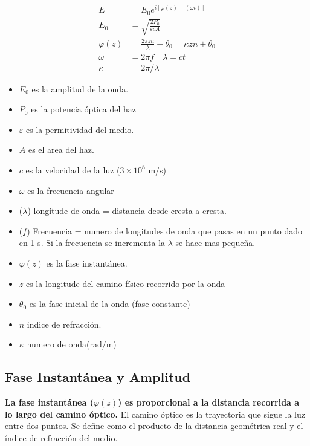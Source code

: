 \documentclass[12pt]{article}
\begin{document}
	\vspace{0.5cm}
	\begin{minipage}{0.45\textwidth}
		\begin{align*}
			E &= E_0 e^{i[\varphi(z) \pm (\omega t)]} \\
			E_0 &= \sqrt{\frac{2P_0}{\varepsilon c A}} \\
			\varphi(z) &= \frac{2\pi z n}{\lambda} + \theta_0 = \kappa z n + \theta_0 \\
			\omega &= 2\pi f \quad \lambda = c t \\
			\kappa &= 2\pi/\lambda
		\end{align*}
	\end{minipage}
	\hfill
	\begin{minipage}{0.5\textwidth}
		\begin{itemize}
			\item $E_0$ es la amplitud de la onda.
			\item $P_0$ es la potencia óptica del haz
			\item $\varepsilon$ es la permitividad del medio.
			\item $A$ es el area del haz.
			\item $c$ es la velocidad de la luz ($3\times10^8$ m/s)
			\item $\omega$ es la frecuencia angular
			\item ($\lambda$) longitude de onda = distancia desde cresta a cresta.
			\item ($f$) Frecuencia = numero de longitudes de onda que pasas en un punto dado en 1 s. Si la frecuencia se incrementa la $\lambda$ se hace mas pequeña.
			\item $\varphi(z)$ es la fase instantánea.
			\item $z$ es la longitude del camino físico recorrido por la onda
			\item $\theta_0$ es la fase inicial de la onda (fase constante)
			\item $n$ indice de refracción.
			\item $\kappa$ numero de onda(rad/m)
		\end{itemize}
	\end{minipage}
	
	\subsection{Fase Instantánea y Amplitud}
	\textbf{La fase instantánea ($\varphi(z)$) es proporcional a la distancia recorrida a lo largo del camino óptico.} El camino óptico es la trayectoria que sigue la luz entre dos puntos. Se define como el producto de la distancia geométrica real y el índice de refracción del medio.
	
\end{document}
